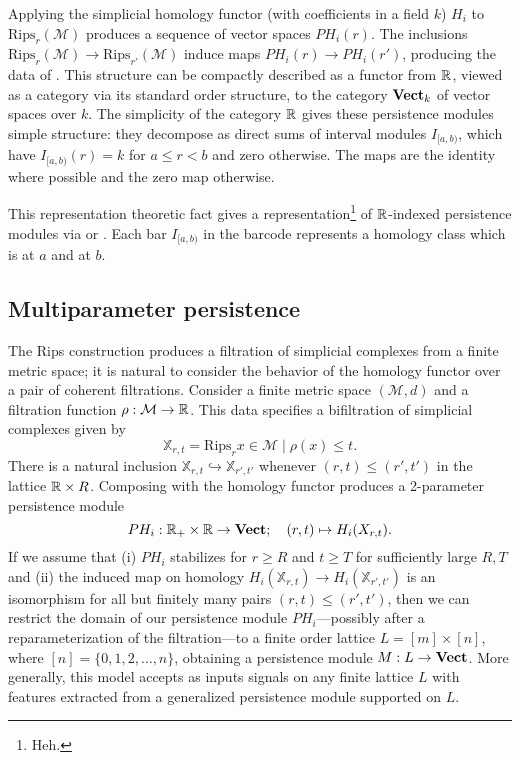 \documentclass{article}
\begin{document}
Applying the simplicial homology functor (with coefficients in a field $k$)
$H_i$ to $\text{Rips}_r(\mathcal M)$ produces a sequence of vector spaces
$PH_i(r)$. The inclusions $\text{Rips}_r(\mathcal M) \to
\text{Rips}_{r'}(\mathcal M)$ induce maps $PH_i(r) \to PH_i(r')$, producing the
data of . This structure can be compactly
described as a functor from $\mathbb{R}$, viewed as a category via its standard order
structure, to the category $\operatorname{\mathbf{Vect}}_k$ of vector spaces over $k$. The simplicity
of the category $\mathbb{R}$ gives these persistence modules simple structure: they
decompose as direct sums of interval modules $I_{[a,b)}$, which have
$I_{[a,b)}(r) = k$ for $a \leq r < b$ and zero otherwise. The maps are
the identity where possible and the zero map otherwise.

This representation theoretic fact gives a representation\footnote{Heh.} of
$\mathbb{R}$-indexed persistence modules via  or
. Each bar $I_{[a,b)}$ in the barcode represents
a homology class which is  at $a$ and  at $b$.

\subsection{Multiparameter persistence}
The Rips construction produces a filtration of simplicial complexes from a
finite metric space; it is natural to consider the behavior of the homology
functor over a pair of coherent filtrations. Consider
a finite metric space $(\mathcal M, d)$ and a filtration
function $\rho:\mathcal M \to \mathbb{R}$. This data specifies a bifiltration of
simplicial complexes given by
\[\mathbb{X}_{r,t} = \text{Rips}_r{x \in \mathcal M \mid \rho(x) \leq t}.\]
There is a natural inclusion $\mathbb{X}_{r,t} \hookrightarrow
\mathbb{X}_{r',t'}$ whenever $(r,t) \leq (r',t')$ in the lattice $\mathbb{R} \times R$.
Composing with the homology functor produces a 2-parameter persistence module
\[PH_{i}: \mathbb{R}_+ \times \mathbb{R} \to \operatorname{\mathbf{Vect}}; \quad (r,t) \mapsto H_i(X_{r,t}).\]
If we assume that (i) $PH_i$ stabilizes for $r \geq R$ and $t \geq T$ for
sufficiently large $R, T$ and (ii) the induced map on homology
$H_i(\mathbb{X}_{r,t}) \to H_i(\mathbb{X}_{r',t'})$ is an isomorphism for all
but finitely many pairs $(r,t) \leq (r',t')$, then we can restrict the domain of
our persistence module $PH_i$---possibly after a reparameterization of the
filtration---to a finite order lattice $L = [m] \times [n]$, where $[n] =
\{0,1,2,\ldots,n\}$, obtaining a persistence module $M: L \to \operatorname{\mathbf{Vect}}$.
More generally, this model accepts as inputs signals on any finite lattice $L$
with features extracted from a generalized persistence module supported on $L$.
\end{document}
